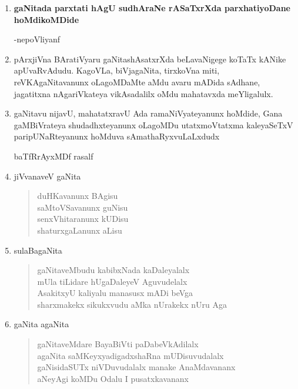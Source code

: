 \begin{enumerate}[\rm 1)]
\item \textbf{gaNitada parxtati hAgU sudhAraNe rASaTxrXda parxhatiyoDane hoMdikoMDide}
\begin{flushright}
-nepoVliyanf
\end{flushright}

\item pArxjiVna BAratiVyaru gaNitashAsatxrXda beLavaNigege koTaTx kANike apUvaRvAdudu. KagoVLa, biVjagaNita, tirxkoVna miti, reVKAgaNitavanunx oLagoMDaMte aMdu avaru mADida sAdhane, jagatitxna nAgariVkateya vikAsadalilx oMdu mahatavxda meYligalulx.

\item gaNitavu nijavU, mahatatxravU Ada ramaNiVyateyanunx hoMdide, Gana gaMBiVrateya shudadhxteyanunx oLagoMDu utatxmoVtatxma kaleyaSeTxV paripUNaR\-teyanunx hoMduva sAmathaRyxvuLaLxdudx 
\begin{flushright}
baTfRrAyxMDf rasalf
\end{flushright}

\item jiVvanaveV gaNita
\begin{center}
\begin{verse}
duHKavanunx BAgisu\\
saMtoVSavanunx guNisu\\
senxVhitaranunx kUDisu\\
shaturxgaLanunx aLisu
\end{verse}
\end{center}

\item sulaBagaNita
\begin{center} 
\begin{verse}
gaNitaveMbudu kabibxNada kaDaleyalalx\\
mUla tiLidare hUgaDaleyeV Aguvudelalx\\
AsakitxyU kaliyalu manasusx mADi beVga\\
sharxmakekx sikukxvudu aMka nUrakekx nUru Aga
\end{verse}
\end{center}

\item gaNita agaNita
\begin{center} 
\begin{verse}
gaNitaveMdare BayaBiVti paDabeVkAdilalx\\
agaNita saMKeyxyadigadxshaRna mUDisuvudalalx\\
gaNisidaSUTx niVDuvudalalx manake AnaMdavananx\\
aNeyAgi koMDu Odalu I pusatxkavananx
\end{verse}
\end{center}


\end{enumerate}
